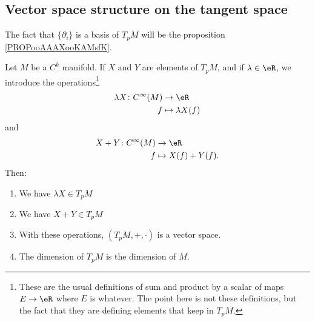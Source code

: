 \subsection{Vector space structure on the tangent space}

The fact that \( \{ \partial_i \}\) is a basis of \( T_pM\) will be the proposition \ref{PROPooAAAXooKAMsfK}.

\begin{definition}		\label{PROPooEJBWooSbvypo}
	Let \( M\) be a \( C^k\) manifold. If \( X\) and \( Y \) are elements of \( T_pM\), and if \( \lambda\in \eR\), we introduce the operations\footnote{These are the usual definitions of sum and product by a scalar of maps \( E\to \eR\) where \( E\) is whatever. The point here is not these definitions, but the fact that they are defining elements that keep in \( T_pM\).}
	\begin{equation}
		\begin{aligned}
			\lambda X\colon  C^{\infty}(M) & \to \eR              \\
			f                              & \mapsto \lambda X(f)
		\end{aligned}
	\end{equation}
	and
	\begin{equation}
		\begin{aligned}
			X+Y\colon  C^{\infty}(M) & \to \eR            \\
			f                        & \mapsto X(f)+Y(f).
		\end{aligned}
	\end{equation}
	Then:
	\begin{enumerate}
		\item
		      We have \( \lambda X\in T_pM\)
		\item
		      We have \( X+Y\in T_pM\)
		\item		\label{ITEMooDRUQooWrsaDd}
		      With these operations, \( (T_pM,+,\cdot)\) is a vector space.
		\item		\label{ITEMooJEYEooLuJiqz}
		      The dimension of \( T_pM\) is the dimension of \( M\).
	\end{enumerate}
\end{definition}


